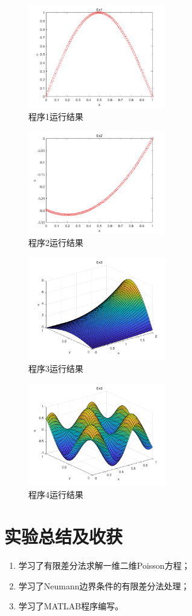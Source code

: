 \documentclass[12pt]{article}
\begin{document}
\begin{figure}[htbp]
    \small
    \centering
    \includegraphics[width=6cm]{Fig/fig1.png}
    \caption{程序1运行结果}\label{fig1}
\end{figure}
\begin{figure}[htbp]
    \small
    \centering
    \includegraphics[width=6cm]{Fig/fig2.png}
    \caption{程序2运行结果}\label{fig2}
\end{figure}
\begin{figure}[htbp]
    \small
    \centering
    \includegraphics[width=6cm]{Fig/fig3.png}
    \caption{程序3运行结果}\label{fig3}
\end{figure}
\begin{figure}[htbp]
    \small
    \centering
    \includegraphics[width=6cm]{Fig/fig4.png}
    \caption{程序4运行结果}\label{fig4}
\end{figure}

\clearpage
\section{实验总结及收获}
\begin{enumerate}
    \item 学习了有限差分法求解一维二维Poisson方程；
    \item 学习了Neumann边界条件的有限差分法处理；
    \item 学习了MATLAB程序编写。
\end{enumerate}
\end{document}
